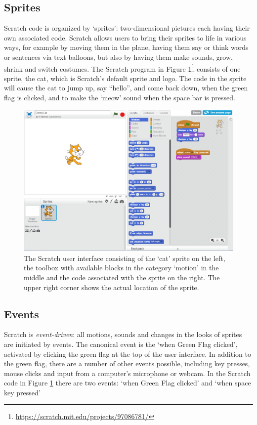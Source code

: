 \documentclass[times,10pt,twocolumn]{article}
\begin{document}
\subsection{Sprites}
Scratch code is organized by `sprites': two-dimensional pictures each having their own associated code. Scratch allows users to bring their sprites to life in various ways, for example by moving them in the plane, having them say or think words or sentences via text balloons, but also by having them make sounds, grow, shrink and switch costumes. The Scratch program in Figure \ref{fig:ui}\footnote{\url{https://scratch.mit.edu/projects/97086781/}} consists of one sprite, the cat, which is Scratch's default sprite and logo. The code in the sprite will cause the cat to jump up, say ``hello'', and come back down, when the green flag is clicked, and to make the `meow' sound when the space bar is pressed.

\begin{figure}
  \begin{center}
  \includegraphics[width=\columnwidth]{fig/ui.png}
  \caption{The Scratch user interface consisting of the `cat' sprite on the left, the toolbox with available blocks in the category `motion' in the middle and the code associated with the sprite on the right. The upper right corner shows the actual location of the sprite.}
  \label{fig:ui}
  \end{center}
\end{figure} 

\subsection{Events}
Scratch is \emph{event-driven}: all motions, sounds and changes in the looks of sprites are initiated by events. The canonical event is the `when Green Flag clicked', activated by clicking the green flag at the top of the user interface. In addition to the green flag, there are a number of other events possible, including key presses, mouse clicks and input from a computer's microphone or webcam. In the Scratch code in Figure \ref{fig:ui} there are two events: `when Green Flag clicked' and `when space key pressed'
\end{document}
